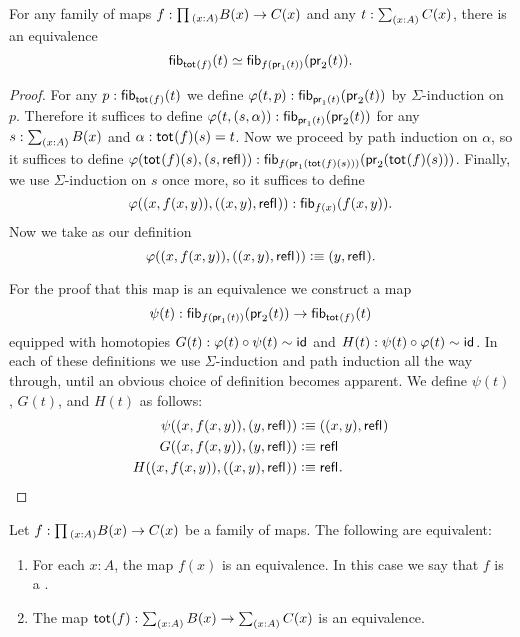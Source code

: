 \begin{lem}\label{lem:fib_total}
  For any family of maps $f:\prd{x:A}B(x)\to C(x)$ and any $t:\sm{x:A}C(x)$,
  there is an equivalence
  \begin{equation*}
    \eqv{\fib{\total{f}}{t}}{\fib{f(\proj 1(t))}{\proj 2(t)}}.
  \end{equation*}
\end{lem}

\begin{proof}
  For any $p:\mathsf{fib}_{\mathsf{tot}_{}(f)}(t)$ we define $\varphi(t,p):\mathsf{fib}_{\mathsf{pr}_{1}(t)}(\mathsf{pr}_{2}(t))$ by $\Sigma$-induction on $p$. Therefore it suffices to define $\varphi(t,(s,\alpha)):\mathsf{fib}_{\mathsf{pr}_{1}(t)}(\mathsf{pr}_{2} (t))$ for any $s:\sm{x:A}B(x)$ and $\alpha:\mathsf{tot}_{}(f)(s)=t$. Now we proceed by path induction on $\alpha$, so it suffices to define $\varphi(\mathsf{tot}_{}(f)(s),(s,\mathsf{refl}_{})):\mathsf{fib}_{f(\mathsf{pr}_{1}(\mathsf{tot}_{}(f)(s)))}(\mathsf{pr}_{2}(\mathsf{tot}_{}(f)(s)))$. Finally, we use $\Sigma$-induction on $s$ once more, so it suffices to define
  \begin{equation*}
    \varphi((x,f(x,y)),((x,y),\mathsf{refl}_{})):\mathsf{fib}_{f(x)}(f(x,y)).
  \end{equation*}
  Now we take as our definition
  \begin{equation*}
    \varphi((x,f(x,y)),((x,y),\mathsf{refl}_{}))\vcentcolon\equiv(y,\mathsf{refl}_{}).
  \end{equation*}

  For the proof that this map is an equivalence we construct a map
  \begin{equation*}
    \psi(t) : \mathsf{fib}_{f(\mathsf{pr}_{1}(t))}(\mathsf{pr}_{2}(t))\to\mathsf{fib}_{\mathsf{tot}_{}(f)}(t)
  \end{equation*}
  equipped with homotopies $G(t):\varphi(t)\circ\psi(t)\sim\mathsf{id}_{}$ and $H(t):\psi(t)\circ\varphi(t)\sim\mathsf{id}_{}$. In each of these definitions we use $\Sigma$-induction and path induction all the way through, until an obvious choice of definition becomes apparent. We define $\psi(t)$, $G(t)$, and $H(t)$ as follows:
  \begin{align*}
    \psi((x,f(x,y)),(y,\mathsf{refl}_{})) & \vcentcolon\equiv ((x,y),\mathsf{refl}_{}) \\
    G((x,f(x,y)),(y,\mathsf{refl}_{})) & \vcentcolon\equiv \mathsf{refl}_{} \\
    H((x,f(x,y)),((x,y),\mathsf{refl}_{})) & \vcentcolon\equiv \mathsf{refl}_{}.\qedhere
  \end{align*}
\end{proof}

\begin{thm}\label{thm:fib_equiv}
Let $f:\prd{x:A}B(x)\to C(x)$ be a family of maps. The following are equivalent:
\begin{enumerate}
\item For each $x:A$, the map $f(x)$ is an equivalence. In this case we say that $f$ is a .
\item The map $\total{f}:\sm{x:A}B(x)\to\sm{x:A}C(x)$ is an equivalence.
\end{enumerate}
\end{thm}

